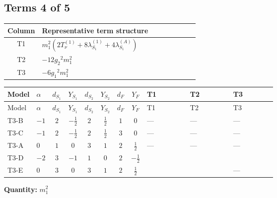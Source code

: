 \documentclass[8pt]{article}
\begin{document}
\begin{landscape}
\subsection*{Terms 4 of 5}
\begin{center}
\begin{tabular}{@{}c >{\raggedright\arraybackslash}p{0.82\linewidth}@{}}
\toprule
Column & Representative term structure \\
\midrule
T1 & \(\displaystyle {m_1^2} (2 T_{\nu}^{(1)}+8 {\lambda_{S_1}^{(1)}}+4 {\lambda_{S_1}^{(A)}})\) \\
\midrule
T2 & \(\displaystyle -12 {g_2}^2 {m_1^2}\) \\
\midrule
T3 & \(\displaystyle -6 {g_1}^2 {m_1^2}\) \\
\midrule
\bottomrule
\end{tabular}
\end{center}
\smallskip
\tiny
\begin{longtable}{@{}llcccccc >{\raggedright\arraybackslash}p{0.21\linewidth} >{\raggedright\arraybackslash}p{0.21\linewidth} >{\raggedright\arraybackslash}p{0.21\linewidth}@{}}
\toprule
Model & $\alpha$ & $d_{S_1}$ & $Y_{S_1}$ & $d_{S_2}$ & $Y_{S_2}$ & $d_F$ & $Y_F$ & T1 & T2 & T3 \\
\midrule
\endfirsthead
\toprule
Model & $\alpha$ & $d_{S_1}$ & $Y_{S_1}$ & $d_{S_2}$ & $Y_{S_2}$ & $d_F$ & $Y_F$ & T1 & T2 & T3 \\
\midrule
\endhead
T3-B & $-1$ & $2$ & $-\frac{1}{2}$ & $2$ & $\frac{1}{2}$ & $1$ & $0$ & --- & --- & --- \\
\midrule
T3-C & $-1$ & $2$ & $-\frac{1}{2}$ & $2$ & $\frac{1}{2}$ & $3$ & $0$ & --- & --- & --- \\
\midrule
T3-A & $0$ & $1$ & $0$ & $3$ & $1$ & $2$ & $\frac{1}{2}$ & --- & --- & --- \\
\midrule
T3-D & $-2$ & $3$ & $-1$ & $1$ & $0$ & $2$ & $-\frac{1}{2}$ & \scriptsize\adjustbox{max width=\linewidth}{$\begin{gathered} {m_1^2} (2 T_{\nu}^{(1)}+8 {\lambda_{S_1}^{(1)}}+4 {\lambda_{S_1}^{(A)}})\end{gathered}$} & \scriptsize\adjustbox{max width=\linewidth}{$\begin{gathered} -12 {g_2}^2 {m_1^2}\end{gathered}$} & \scriptsize\adjustbox{max width=\linewidth}{$\begin{gathered} -6 {g_1}^2 {m_1^2}\end{gathered}$} \\
\midrule
T3-E & $0$ & $3$ & $0$ & $3$ & $1$ & $2$ & $\frac{1}{2}$ & \scriptsize\adjustbox{max width=\linewidth}{$\begin{gathered} {m_1^2} (2 T_{\nu}^{(1)}+8 {\lambda_{S_1}^{(1)}}+4 {\lambda_{S_1}^{(A)}})\end{gathered}$} & \scriptsize\adjustbox{max width=\linewidth}{$\begin{gathered} -12 {g_2}^2 {m_1^2}\end{gathered}$} & --- \\
\midrule
\bottomrule
\end{longtable}
\clearpage
\noindent\textbf{Quantity: }$m_1^2$\par\smallskip

\end{landscape}
\end{document}

